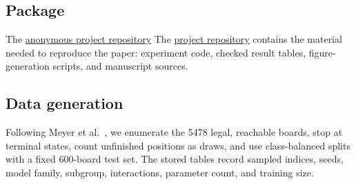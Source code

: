 \subsection{Package}
\ifanonymouspaper
The \href{https://anonymous.4open.science/r/qc_symmetry-5FB4/}{anonymous project repository}
\else
The \href{https://github.com/eybmits/vqml-symmetry}{project repository}
\fi
contains the material needed to reproduce the paper: experiment code, checked
result tables, figure-generation scripts, and manuscript sources.

\subsection{Data generation}
Following Meyer et al.~\cite{meyer2023symmetry}, we enumerate the 5478 legal,
reachable boards, stop at terminal states, count unfinished positions as draws,
and use class-balanced splits with a fixed 600-board test set. The stored
tables record sampled indices, seeds, model family, subgroup, interactions,
parameter count, and training size.
